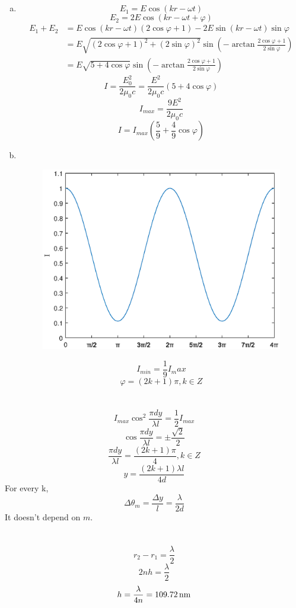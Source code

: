 \documentclass{article}
\begin{document}
\section{}
\begin{enumerate}[(a)]
\item
$$E_1=E\cos(kr-\omega t)$$
$$E_2=2E\cos(kr-\omega t+\varphi)$$
\begin{align*}
E_1+E_2&=E\cos(kr-\omega t)(2\cos\varphi+1)-2E\sin(kr-\omega t)\sin\varphi\\
&=E\sqrt{(2\cos\varphi+1)^2+(2\sin\varphi)^2}\sin\left(-\arctan\frac{2\cos\varphi+1}{2\sin\varphi}\right)\\
&=E\sqrt{5+4\cos\varphi}\sin\left(-\arctan\frac{2\cos\varphi+1}{2\sin\varphi}\right)
\end{align*}
$$I=\frac{E_0^2}{2\mu_0c}=\frac{E^2}{2\mu_0c}(5+4\cos\varphi)$$
$$I_{max}=\frac{9E^2}{2\mu_0c}$$
$$I=I_{max}\left(\frac{5}{9}+\frac{4}{9}\cos\varphi\right)$$
\newpage
\item \ 
\begin{figure}[!h]
\centering
\includegraphics[scale=0.5]{1.eps}
\end{figure}
$$I_{min}=\frac{1}{9}I_max$$
$$\varphi=(2k+1)\pi,k\in Z$$
\end{enumerate}

\section{}
$$I_{max}\cos^2\frac{\pi dy}{\lambda l}=\frac{1}{2}I_{max}$$
$$\cos\frac{\pi dy}{\lambda l}=\pm\frac{\sqrt{2}}{2}$$
$$\frac{\pi dy}{\lambda l}=\frac{(2k+1)\pi}{4},k\in Z$$
$$y=\frac{(2k+1)\lambda l}{4d}$$
For every k,
$$\Delta\theta_m=\frac{\Delta y}{l}=\frac{\lambda}{2d}$$
It doesn't depend on $m$.

\section{}
$$r_2-r_1=\frac{\lambda}{2}$$
$$2nh=\frac{\lambda}{2}$$
$$h=\frac{\lambda}{4n}=109.72\,\rm nm$$
\end{document}
